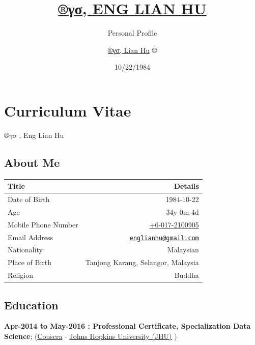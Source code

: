 \documentclass[]{article}
\title{\href{https://beta.rstudioconnect.com/content/3091/ryo-eng.html}{{®γσ,
ENG LIAN HU}}}
\subtitle{Personal Profile}
\author{\href{https://englianhu.github.io/}{®γσ, Lian Hu} ®}
\date{10/22/1984}
\begin{document}
\maketitle

{
\setcounter{tocdepth}{2}
\tableofcontents
}
\section{Curriculum Vitae}\label{curriculum-vitae}

\(®γσ\) , Eng Lian Hu

\subsection{About Me}\label{about-me}

\begin{longtable}[]{@{}lr@{}}
\toprule
\textbf{Title} & \textbf{Details}\tabularnewline
\midrule
\endhead
Date of Birth & 1984-10-22\tabularnewline
Age & 34y 0m 4d\tabularnewline
Mobile Phone Number &
\href{tel:+60172100905}{+6-017-2100905}\tabularnewline
Email Address &
\href{mailto:englianhu@gmail.com}{\nolinkurl{englianhu@gmail.com}}\tabularnewline
Nationality & Malaysian\tabularnewline
Place of Birth & Tanjong Karang, Selangor, Malaysia\tabularnewline
Religion & Buddha\tabularnewline
\bottomrule
\end{longtable}

\subsection{Education}\label{education}

\textbf{Apr-2014 to May-2016 : Professional Certificate, Specialization
Data Science}; (\href{http://www.coursera.org}{Cousera} -
\href{https://www.jhu.edu/}{Johns Hopkins University (JHU)} )
\end{document}
